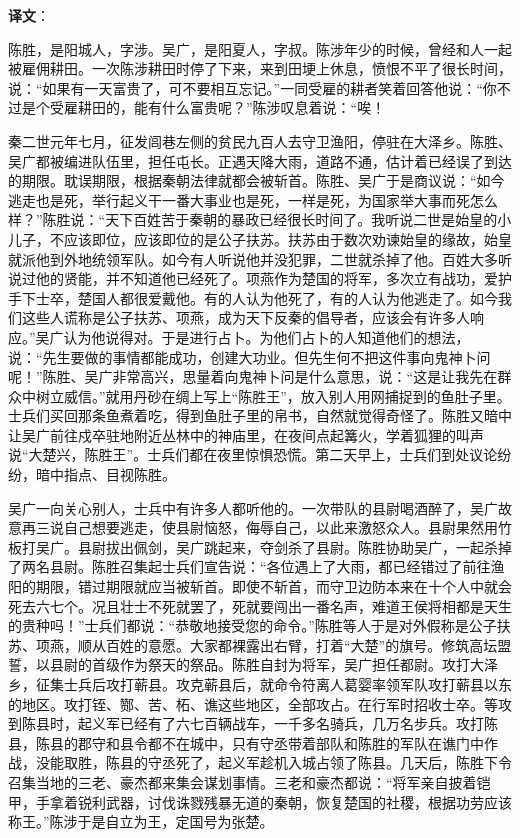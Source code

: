 \documentclass[12pt,UTF-8,openany]{ctexbook}
\begin{document}
\newpage

\textbf{译文}：

\vspace{1em}

\begin{normalsize}
    
    陈胜，是阳城人，字涉。吴广，是阳夏人，字叔。陈涉年少的时候，曾经和人一起被雇佣耕田。一次陈涉耕田时停了下来，来到田埂上休息，愤恨不平了很长时间，说：“如果有一天富贵了，可不要相互忘记。”一同受雇的耕者笑着回答他说：“你不过是个受雇耕田的，能有什么富贵呢？”陈涉叹息着说：“唉！
    
    秦二世元年七月，征发闾巷左侧的贫民九百人去守卫渔阳，停驻在大泽乡。陈胜、吴广都被编进队伍里，担任屯长。正遇天降大雨，道路不通，估计着已经误了到达的期限。耽误期限，根据秦朝法律就都会被斩首。陈胜、吴广于是商议说：“如今逃走也是死，举行起义干一番大事业也是死，一样是死，为国家举大事而死怎么样？”陈胜说：“天下百姓苦于秦朝的暴政已经很长时间了。我听说二世是始皇的小儿子，不应该即位，应该即位的是公子扶苏。扶苏由于数次劝谏始皇的缘故，始皇就派他到外地统领军队。如今有人听说他并没犯罪，二世就杀掉了他。百姓大多听说过他的贤能，并不知道他已经死了。项燕作为楚国的将军，多次立有战功，爱护手下士卒，楚国人都很爱戴他。有的人认为他死了，有的人认为他逃走了。如今我们这些人谎称是公子扶苏、项燕，成为天下反秦的倡导者，应该会有许多人响应。”吴广认为他说得对。于是进行占卜。为他们占卜的人知道他们的想法，说：“先生要做的事情都能成功，创建大功业。但先生何不把这件事向鬼神卜问呢！”陈胜、吴广非常高兴，思量着向鬼神卜问是什么意思，说：“这是让我先在群众中树立威信。”就用丹砂在绸上写上“陈胜王”，放入别人用网捕捉到的鱼肚子里。士兵们买回那条鱼煮着吃，得到鱼肚子里的帛书，自然就觉得奇怪了。陈胜又暗中让吴广前往戍卒驻地附近丛林中的神庙里，在夜间点起篝火，学着狐狸的叫声说“大楚兴，陈胜王”。士兵们都在夜里惊惧恐慌。第二天早上，士兵们到处议论纷纷，暗中指点、目视陈胜。
    
    吴广一向关心别人，士兵中有许多人都听他的。一次带队的县尉喝酒醉了，吴广故意再三说自己想要逃走，使县尉恼怒，侮辱自己，以此来激怒众人。县尉果然用竹板打吴广。县尉拔出佩剑，吴广跳起来，夺剑杀了县尉。陈胜协助吴广，一起杀掉了两名县尉。陈胜召集起士兵们宣告说：“各位遇上了大雨，都已经错过了前往渔阳的期限，错过期限就应当被斩首。即使不斩首，而守卫边防本来在十个人中就会死去六七个。况且壮士不死就罢了，死就要闯出一番名声，难道王侯将相都是天生的贵种吗！”士兵们都说：“恭敬地接受您的命令。”陈胜等人于是对外假称是公子扶苏、项燕，顺从百姓的意愿。大家都裸露出右臂，打着“大楚”的旗号。修筑高坛盟誓，以县尉的首级作为祭天的祭品。陈胜自封为将军，吴广担任都尉。攻打大泽乡，征集士兵后攻打蕲县。攻克蕲县后，就命令符离人葛婴率领军队攻打蕲县以东的地区。攻打铚、酂、苦、柘、谯这些地区，全部攻占。在行军时招收士卒。等攻到陈县时，起义军已经有了六七百辆战车，一千多名骑兵，几万名步兵。攻打陈县，陈县的郡守和县令都不在城中，只有守丞带着部队和陈胜的军队在谯门中作战，没能取胜，陈县的守丞死了，起义军趁机入城占领了陈县。几天后，陈胜下令召集当地的三老、豪杰都来集会谋划事情。三老和豪杰都说：“将军亲自披着铠甲，手拿着锐利武器，讨伐诛戮残暴无道的秦朝，恢复楚国的社稷，根据功劳应该称王。”陈涉于是自立为王，定国号为张楚。
    

\end{normalsize}
\end{document}
